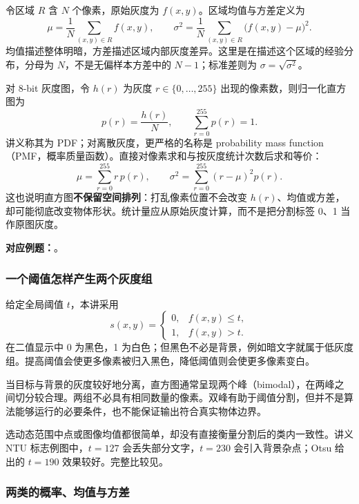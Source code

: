 
令区域 $R$ 含 $N$ 个像素，原始灰度为 $f(x,y)$。区域均值与方差定义为
\[
  \mu=\frac{1}{N}\sum_{(x,y)\in R}f(x,y),\qquad
  \sigma^2=\frac{1}{N}\sum_{(x,y)\in R}\bigl(f(x,y)-\mu\bigr)^2.
\]
均值描述整体明暗，方差描述区域内部灰度差异。这里是在描述这个区域的经验分布，分母为 $N$，不是无偏样本方差中的 $N-1$；标准差则为 $\sigma=\sqrt{\sigma^2}$。

对 8-bit 灰度图，令 $h(r)$ 为灰度 $r\in\{0,\ldots,255\}$ 出现的像素数，则归一化直方图为
\[
  p(r)=\frac{h(r)}{N},\qquad \sum_{r=0}^{255}p(r)=1.
\]
讲义称其为 PDF；对离散灰度，更严格的名称是 probability mass function（PMF，概率质量函数）。直接对像素求和与按灰度统计次数后求和等价：
\[
  \boxed{\mu=\sum_{r=0}^{255}r\,p(r)},\qquad
  \boxed{\sigma^2=\sum_{r=0}^{255}(r-\mu)^2p(r)}.
\]
这也说明直方图\textbf{不保留空间排列}：打乱像素位置不会改变 $h(r)$、均值或方差，却可能彻底改变物体形状。统计量应从原始灰度计算，而不是把分割标签 0、1 当作原图灰度。

\textbf{对应例题：}。


\subsubsection*{一个阈值怎样产生两个灰度组}

给定全局阈值 $t$，本讲采用
\[
  s(x,y)=
  \begin{cases}
    0,& f(x,y)\le t,\\
    1,& f(x,y)>t.
  \end{cases}
\]
在二值显示中 0 为黑色，1 为白色；但黑色不必是背景，例如暗文字就属于低灰度组。提高阈值会使更多像素被归入黑色，降低阈值则会使更多像素变白。

当目标与背景的灰度较好地分离，直方图通常呈现两个峰（bimodal），在两峰之间切分较合理。两组不必具有相同数量的像素。双峰有助于阈值分割，但并不是算法能够运行的必要条件，也不能保证输出符合真实物体边界。

选动态范围中点或图像均值都很简单，却没有直接衡量分割后的类内一致性。讲义 NTU 标志例图中，$t=127$ 会丢失部分文字，$t=230$ 会引入背景杂点；Otsu 给出的 $t=190$ 效果较好。完整比较见。

\subsubsection*{两类的概率、均值与方差}

